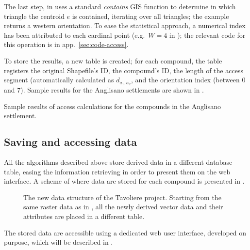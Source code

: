                 The last step, in  uses a standard \emph{contains} GIS function to determine in which triangle the centroid $e$ is contained, iterating over all triangles; the example returns a western orientation. To ease the statistical approach, a numerical index has been attributed to each cardinal point (e.g.\ $W = 4$ in ); the relevant code for this operation is in app.~\ref{sec:code-access}.

                To store the results, a new table is created; for each compound, the table registers the original Shapefile's ID, the compound's ID, the length of the access segment (automatically calculated as $d_{a_1, a_2}$, and the orientation index (between $0$ and $7$). Sample results for the Anglisano settlements are shown in .
                \begin{table}[!htb]
                    \centering
                    
                    \caption[Sample results of access calculations for the compounds in the Anglisano settlement]{Sample results of access calculations for the compounds in the Anglisano settlement.}
                    \label{tab:tab-access-anglisano}
                \end{table}

        \subsection{Saving and accessing data}
            All the algorithms described above store derived data in a different database table, easing the information retrieving in order to present them on the web interface. A scheme of where data are stored for each compound is presented in .

            \begin{figure}[H]
                \centering
                \caption[The three different tables to store compound's derived data]{The new data structure of the Tavoliere project. Starting from the same raster data as in , all the newly derived vector data and their attributes are placed in a different table.}
                \label{fig:scheme-derive-2}
            \end{figure}

            The stored data are accessible using a dedicated web user interface, developed on purpose, which will be described in .


